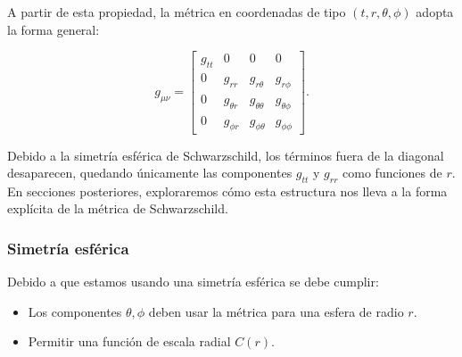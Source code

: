 A partir de esta propiedad, la métrica en coordenadas de tipo \((t, r, \theta, \phi)\) adopta la forma general:

\begin{equation}
    g_{\mu \nu} =
    \begin{bmatrix}
        g_{tt} & 0            & 0                & 0              \\
        0      & g_{rr}       & g_{r\theta}      & g_{r\phi}      \\
        0      & g_{\theta r} & g_{\theta\theta} & g_{\theta\phi} \\
        0      & g_{\phi r}   & g_{\phi\theta}   & g_{\phi\phi}
    \end{bmatrix}.
\end{equation}

Debido a la simetría esférica de Schwarzschild, los términos fuera de la diagonal desaparecen, quedando únicamente las componentes \( g_{tt} \) y \( g_{rr} \) como funciones de \( r \). En secciones posteriores, exploraremos cómo esta estructura nos lleva a la forma explícita de la métrica de Schwarzschild.


\subsubsection*{Simetría esférica}
Debido a que estamos usando una simetría esférica se debe cumplir:
\begin{itemize}
    \item Los componentes $\theta, \phi$ deben usar la métrica para una esfera de radio $r$.
    \item Permitir una función de escala radial $C(r)$.
\end{itemize}

